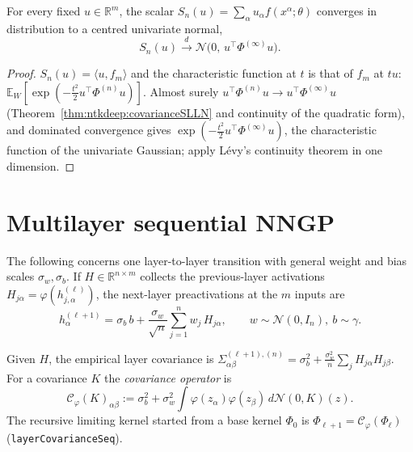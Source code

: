 \begin{theorem}\label{thm:ntkdeep:projectionLimit}
  \leanok
For every fixed $u\in\mathbb R^m$, the scalar $S_n(u)=\sum_\alpha u_\alpha f(x^\alpha;\theta)$ converges in distribution to a centred univariate normal,
\[
  S_n(u)\xrightarrow{d}\mathcal N\bigl(0,\,u^\top\Phi^{(\infty)}u\bigr).
\]
\end{theorem}

\begin{proof}
  \leanok
$S_n(u)=\langle u,f_m\rangle$ and the characteristic function at $t$ is that of $f_m$ at $tu$: $\mathbb E_W[\exp(-\frac{t^2}2u^\top\Phi^{(n)}u)]$. Almost surely $u^\top\Phi^{(n)}u\to u^\top\Phi^{(\infty)}u$ (Theorem~\ref{thm:ntkdeep:covarianceSLLN} and continuity of the quadratic form), and dominated convergence gives $\exp(-\frac{t^2}2u^\top\Phi^{(\infty)}u)$, the characteristic function of the univariate Gaussian;
apply L\'evy's continuity theorem in one dimension.
\end{proof}


\section{Multilayer sequential NNGP}\label{sec:ntkdeep:multilayer}

The following concerns one layer-to-layer transition with general weight and bias scales $\sigma_w,\sigma_b$. If $H\in\mathbb R^{n\times m}$ collects the previous-layer activations $H_{j\alpha}=\varphi(h^{(\ell)}_{j,\alpha})$, the next-layer preactivations at the $m$ inputs are
\[
  h^{(\ell+1)}_\alpha=\sigma_b\,b+\frac{\sigma_w}{\sqrt n}\sum_{j=1}^nw_j\,H_{j\alpha},\qquad w\sim\mathcal N(0,I_n),\ b\sim\gamma .
\]

\begin{definition}\label{def:ntkdeep:layerCovariance}
  \leanok
Given $H$, the empirical layer covariance is $\Sigma^{(\ell+1),(n)}_{\alpha\beta}=\sigma_b^2+\frac{\sigma_w^2}n\sum_jH_{j\alpha}H_{j\beta}$. For a covariance $K$ the \emph{covariance operator} is
\[
  \mathcal C_\varphi(K)_{\alpha\beta}:=\sigma_b^2+\sigma_w^2\int\varphi(z_\alpha)\varphi(z_\beta)\,d\mathcal N(0,K)(z).
\]
The recursive limiting kernel started from a base kernel $\Phi_0$ is $\Phi_{\ell+1}=\mathcal C_\varphi(\Phi_\ell)$ (\texttt{layerCovarianceSeq}).
\end{definition}

